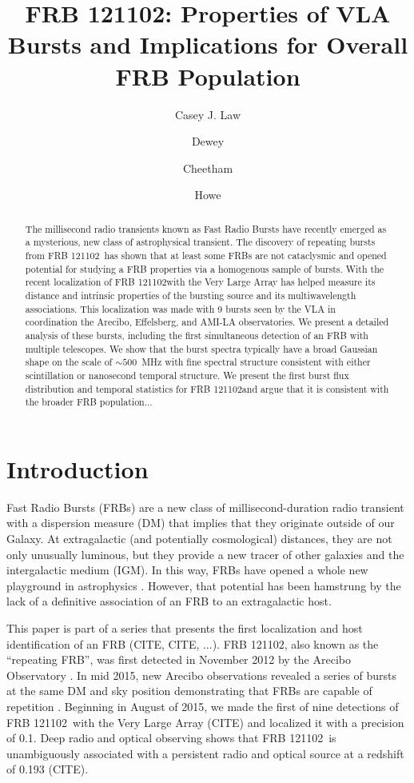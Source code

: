\documentclass{emulateapj}
\newcommand{\frb}{FRB 121102}
\begin{document}
\title{\frb: Properties of VLA Bursts and Implications for Overall FRB Population}
\shorttitle{\frb\ Burst Properties}

\author{Casey J. Law}
\author{Dewey}
\author{Cheetham}\author{Howe}

\begin{abstract}
The millisecond radio transients known as Fast Radio Bursts have recently emerged as a mysterious, new class of astrophysical transient. The discovery of repeating bursts from \frb\ has shown that at least some FRBs are not cataclysmic and opened potential for studying a FRB properties via a homogenous sample of bursts. With the recent localization of \frb with the Very Large Array has helped measure its distance and intrinsic properties of the bursting source and its multiwavelength associations. This localization was made with 9 bursts seen by the VLA in coordination the Arecibo, Effelsberg, and AMI-LA observatories. We present a detailed analysis of these bursts, including the first simultaneous detection of an FRB with multiple telescopes. We show that the burst spectra typically have a broad Gaussian shape on the scale of $\sim500$~MHz with fine spectral structure consistent with either scintillation or nanosecond temporal structure. We present the first burst flux distribution and temporal statistics for \frb and argue that it is consistent with the broader FRB population...
\end{abstract}

\section{Introduction}
Fast Radio Bursts (FRBs) are a new class of millisecond-duration radio transient with a dispersion measure (DM) that implies that they originate outside of our Galaxy. At extragalactic (and potentially cosmological) distances, they are not only unusually luminous, but they provide a new tracer of other galaxies and the intergalactic medium (IGM). In this way, FRBs have opened a whole new playground in astrophysics \citep[e.g.,][]{2014A&A...562A.137F, 2014ApJ...780L..33M, 2016MNRAS.457..232C}. However, that potential has been hamstrung by the lack of a definitive association of an FRB to an extragalactic host.

This paper is part of a series that presents the first localization and host identification of an FRB (CITE, CITE, ...). \frb, also known as the ``repeating FRB'', was first detected in November 2012 by the Arecibo Observatory \citep{2014ApJ...790..101S}. In mid 2015, new Arecibo observations revealed a series of bursts at the same DM and sky position demonstrating that FRBs are capable of repetition \citep{2016Natur.531..202S}. Beginning in August of 2015, we made the first of nine detections of \frb\ with the Very Large Array (CITE) and localized it with a precision of 0.1\arcsec. Deep radio and optical observing shows that \frb\ is unambiguously associated with a persistent radio and optical source at a redshift of 0.193 (CITE).
\end{document}
